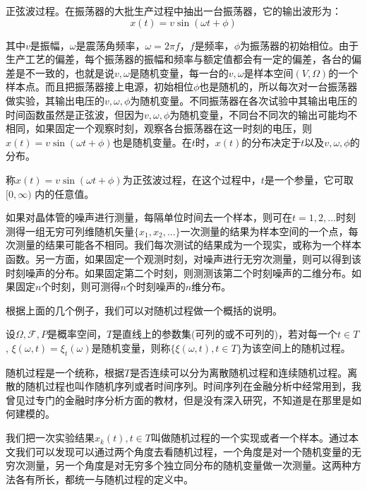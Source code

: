 \documentclass[10pt,a4paper,UTF8]{article}
\begin{document}
\begin{instance}
正弦波过程。在振荡器的大批生产过程中抽出一台振荡器，它的输出波形为：
\begin{equation}
\label{eq:3}
x(t) = v\sin(\omega t + \phi)
\end{equation}

其中\(v\)是振幅，\(\omega\)是震荡角频率，\(\omega = 2\pi f\)，\(f\)是频率，\(\phi\)为振荡器的初始相位。由于生产工艺的偏差，每个振荡器的振幅和频率与额定值都会有一定的偏差，各台的偏差是不一致的，也就是说\(v,\omega\)是随机变量，每一台的\(v,\omega\)是样本空间\((V,\Omega)\)的一个样本点。而且把振荡器接上电源，初始相位\(\phi\)也是随机的，所以每次对一台振荡器做实验，其输出电压的\(v,\omega,\phi\)为随机变量。不同振荡器在各次试验中其输出电压的时间函数虽然是正弦波，但因为\(v,\omega,\phi\)为随机变量，不同台不同次的输出可能均不相同，如果固定一个观察时刻，观察各台振荡器在这一时刻的电压，则\(x(t) = v\sin (\omega t + \phi)\)也是随机变量。在\(t\)时，\(x(t)\)的分布决定于\(t\)以及\(v,\omega,\phi\)的分布。

称\(x(t) = v\sin (\omega t + \phi)\)为正弦波过程，在这个过程中，\(t\)是一个参量，它可取\([0,\infty)\) 内的任意值。
\end{instance}

\begin{instance}
如果对晶体管的噪声进行测量，每隔单位时间去一个样本，则可在\(t=1,2,\ldots\)时刻测得一组无穷可列维随机矢量\(\{x_{1},x_{2},\ldots \}\)一次测量的结果为样本空间的一个点，每次测量的结果可能各不相同。我们每次测试的结果成为一个现实，或称为一个样本函数。另一方面，如果固定一个观测时刻，对噪声进行无穷次测量，则可以得到该时刻噪声的分布。如果固定第二个时刻，则测测该第二个时刻噪声的二维分布。如果固定\(n\)个时刻，则可测得\(n\)个时刻噪声的\(n\)维分布。
\end{instance}

根据上面的几个例子，我们可以对随机过程做一个概括的说明。
\begin{definition}
设\(\Omega, \mathcal{F},P\)是概率空间，\(T\)是直线上的参数集(可列的或不可列的)，若对每一个\(t\in T\), \(\xi(\omega,t) = \xi_{t}(\omega)\)是随机变量，则称\(\{\xi(\omega,t),t\in T\}\)为该空间上的随机过程。
\end{definition}

随机过程是一个统称，根据\(T\)是否连续可以分为离散随机过程和连续随机过程。离散的随机过程也叫作随机序列或者时间序列。时间序列在金融分析中经常用到，我曾见过专门的金融时序分析方面的教材，但是没有深入研究，不知道是在那里是如何建模的。

我们把一次实验结果\(x_{k}(t),t\in T\)叫做随机过程的一个实现或者一个样本。通过本文我们可以发现可以通过两个角度去看随机过程，一个角度是对一个随机变量的无穷次测量，另一个角度是对无穷多个独立同分布的随机变量做一次测量。这两种方法各有所长，都统一与随机过程的定义中。
\end{document}
